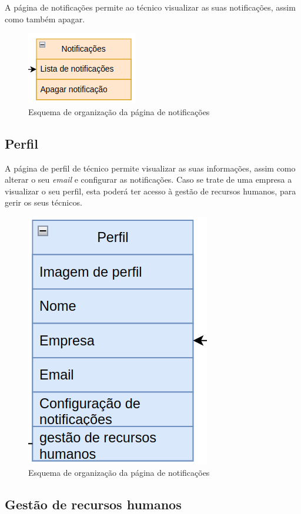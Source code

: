 A página de notificações permite ao técnico visualizar as suas notificações, assim como também apagar.
\begin{figure}[htb]
    \centering
    
    \includegraphics[height=0.2\textwidth]{images/Arquiteturas/superficial_de_app/notificacoes.png}
    \caption{Esquema de organização da página de notificações}
    \label{fig:9}
\end{figure}

\subsection{Perfil}

A página de perfil de técnico permite visualizar as suas informações, assim como alterar 
o seu \textit{email} e configurar as notificações. Caso se trate de uma empresa a visualizar o seu perfil, esta poderá ter acesso à gestão de recursos humanos, para gerir os seus técnicos.
\begin{figure}[htb]
    \centering
    
    \includegraphics[height=0.35\textwidth]{images/Arquiteturas/superficial_de_app/perfil.png}
    \caption{Esquema de organização da página de notificações}
    \label{fig:10}
\end{figure}

\newpage

\subsection{Gestão de recursos humanos}

